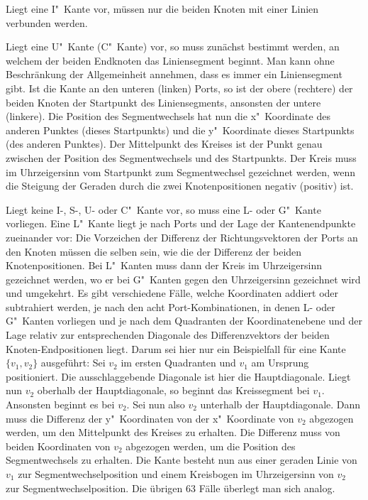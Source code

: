 \documentclass[a4paper]{scrreprt}
\theoremstyle{definition}
\begin{document}
Liegt eine I"~Kante vor, müssen nur die beiden Knoten mit einer Linien verbunden werden. %

Liegt eine U"~Kante (C"~Kante) vor, so muss zunächst bestimmt werden, an welchem der beiden Endknoten das Liniensegment beginnt. Man kann ohne Beschränkung der Allgemeinheit annehmen, dass es immer ein Liniensegment gibt. Ist die Kante an den unteren (linken) Ports, so ist der obere (rechtere) der beiden Knoten der Startpunkt des Liniensegments, ansonsten der untere  (linkere). Die Position des Segmentwechsels hat nun die x"~Koordinate des anderen Punktes (dieses Startpunkts) und die y"~Koordinate dieses Startpunkts (des anderen Punktes). Der Mittelpunkt des Kreises ist der Punkt genau zwischen der Position des Segmentwechsels und des Startpunkts. Der Kreis muss im Uhrzeigersinn vom Startpunkt zum Segmentwechsel gezeichnet werden, wenn die Steigung der Geraden durch die zwei Knotenpositionen negativ (positiv) ist.

Liegt keine I-, S-, U- oder C"~Kante vor, so muss eine L- oder G"~Kante vorliegen. Eine L"~Kante liegt je nach Ports und der Lage der Kantenendpunkte zueinander vor: Die Vorzeichen der Differenz der Richtungsvektoren der Ports an den Knoten müssen die selben sein, wie die der Differenz der beiden Knotenpositionen. Bei L"~Kanten muss dann der Kreis im Uhrzeigersinn gezeichnet werden, wo er bei G"~Kanten gegen den Uhrzeigersinn gezeichnet wird und umgekehrt. Es gibt verschiedene Fälle, welche Koordinaten addiert oder subtrahiert werden, je nach den acht Port-Kombinationen, in denen  L- oder G"~Kanten vorliegen und je nach dem Quadranten der Koordinatenebene und der Lage relativ zur entsprechenden Diagonale des Differenzvektors der beiden Knoten-Endpositionen liegt. Darum sei hier nur ein Beispielfall für eine Kante $\{v_1, v_2\}$ ausgeführt: Sei $v_2$ im ersten Quadranten und $v_1$ am Ursprung positioniert. Die ausschlaggebende Diagonale ist hier die Hauptdiagonale. Liegt nun $v_2$ oberhalb der Hauptdiagonale, so beginnt das Kreissegment bei $v_1$. Ansonsten beginnt es bei $v_2$. Sei nun also $v_2$ unterhalb der Hauptdiagonale. Dann muss die Differenz der y"~Koordinaten von der x"~Koordinate von $v_2$ abgezogen werden, um den Mittelpunkt des Kreises zu erhalten. Die Differenz muss von beiden Koordinaten von $v_2$ abgezogen werden, um die Position des Segmentwechsels zu erhalten. Die Kante besteht nun aus einer geraden Linie von $v_1$ zur Segmentwechselposition und einem Kreisbogen im Uhrzeigersinn von $v_2$ zur Segmentwechselposition. Die übrigen 63 Fälle überlegt man sich analog.
\end{document}
